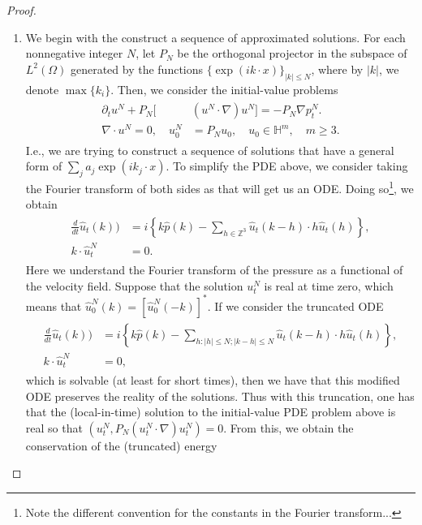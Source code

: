 \documentclass{article}
\begin{document}
\begin{proof}
	\begin{enumerate}[itemsep =-2pt,label = (\roman{*})]
		\item We begin with the construct a sequence of approximated solutions. For each nonnegative integer $N$, let $P_{N}$ be the orthogonal projector in the subspace of $L^{2}(\Omega)$ generated by the functions $\{\exp(ik \cdot x)\}_{|k|\leq N}$, where by $|k|$, we denote $\max\{k_{i}\}$.  Then, we consider the initial-value problems 
		\begin{align*}
			\begin{split}
				\partial_{t}u^{N} + P_{N}[&(u^{N} \cdot \nabla)u^{N}] = -P_{N}\nabla p_{t}^{N}. \\
				\nabla \cdot u^{N} = 0, \quad u_{0}^{N} &= P_{N}u_{0}, \quad u_{0} \in \mathbb{H}^{m}, \quad m \geq 3. 
			\end{split} 
		\end{align*} 
		I.e., we are trying to construct a sequence of solutions that have a general form of $\sum_{j}a_{j}\exp(ik_{j} \cdot x)$. To simplify the PDE above, we consider taking the Fourier transform of both sides as that will get us an ODE. Doing so\footnote{Note the different convention for the constants in the Fourier transform...}, we obtain 
		\begin{align*}
			\begin{split} 
			\frac{d}{dt}\hat{u}_{t}(k)) &= i\left\{k\hat{p}(k) - \sum_{h \in \mathbb{Z}^{3}}\hat{u}_{t}(k - h) \cdot h\hat{u}_{t}(h)\right\}, \\ 
			k \cdot \hat{u}_{t}^{N} &= 0. 
			\end{split} 
		\end{align*} 
		Here we understand the Fourier transform of the pressure as a functional of the velocity field. Suppose that the solution $u_{t}^{N}$ is real at time zero, which means that $\hat{u}_{0}^{N}(k) = [\hat{u}^{N}_{0}(-k)]^{\ast}$. If we consider the truncated ODE 
		\begin{align*}
			\begin{split} 
				\frac{d}{dt}\hat{u}_{t}(k)) &= i\left\{k\hat{p}(k) - \sum_{h: |h|\leq N; |k - h| \leq N}\hat{u}_{t}(k - h) \cdot h\hat{u}_{t}(h)\right\}, \\ 
				k \cdot \hat{u}_{t}^{N} &= 0, 
			\end{split} 
		\end{align*} 
		which is solvable (at least for short times), then we have that this modified ODE preserves the reality of the solutions. Thus with this truncation, one has that the (local-in-time) solution to the initial-value PDE problem above is real so that $(u_{t}^{N}, P_{N}(u_{t}^{N} \cdot \nabla)u_{t}^{N}) = 0$. From this, we obtain the conservation of the (truncated) energy 

\end{enumerate}
\end{proof}
\end{document}

